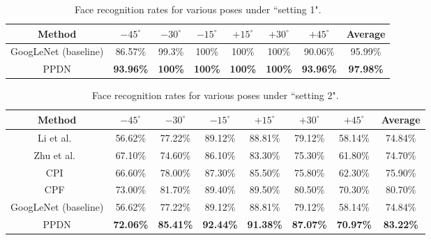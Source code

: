 \documentclass[runningheads]{llncs}
\begin{document}
\setlength{\tabcolsep}{2pt}
\begin{table}[!tp]
	\begin{center}
		\caption{Face recognition rates for various poses under ``setting 1". }
		\label{table:face recognition}
		\begin{tabular}{c|c|c|c|c|c|c|c}
			\hline\noalign{\smallskip}
			Method  & $-45^{\circ}$& $-30^{\circ}$& $-15^{\circ}$& $+15^{\circ}$& $+30^{\circ}$& $+45^{\circ}$&Average\\

			\hline

			GoogLeNet (baseline)& 86.57\% & 99.3\% & 100\% & 100\%& 100\% &90.06\% & 95.99\%\\
			PPDN & \textbf{93.96\%}& \textbf{100\%} & \textbf{100\%} & \textbf{100\%} & \textbf{100\%} & \textbf{93.96\%} & \textbf{97.98\%}\\
			\hline
		\end{tabular}
	\end{center}
\end{table}


\setlength{\tabcolsep}{2pt}
\begin{table}[!tp]
	\begin{center}
		\caption{Face recognition rates for various poses under ``setting 2". }
		\label{table:face recognition2}
		\begin{tabular}{c|c|c|c|c|c|c|c}
			\hline\noalign{\smallskip}
			Method  & $-45^{\circ}$& $-30^{\circ}$& $-15^{\circ}$& $+15^{\circ}$& $+30^{\circ}$& $+45^{\circ}$&Average\\

			\hline

			Li et al.~\cite{li2012coupled}& 56.62\% & 77.22\% & 89.12\% & 88.81\%& 79.12\% &58.14\% & 74.84\%\\
			Zhu et al.~\cite{zhu2013deep}& 67.10\% & 74.60\% & 86.10\% & 83.30\%& 75.30\% &61.80\% & 74.70\%\\
			CPI~\cite{yim2015rotating}& 66.60\% & 78.00\% & 87.30\% & 85.50\%& 75.80\% &62.30\% & 75.90\%\\
			CPF~\cite{yim2015rotating}& 73.00\% & 81.70\% & 89.40\% & 89.50\%& 80.50\% &70.30\% & 80.70\%\\
			GoogLeNet (baseline)& 56.62\% & 77.22\% & 89.12\% & 88.81\%& 79.12\% &58.14\% & 74.84\%\\
			\hline
			PPDN & \textbf{72.06\%} & \textbf{85.41\%} & \textbf{92.44\%} & \textbf{91.38\%}& \textbf{87.07\%} &\textbf{70.97\%} & \textbf{83.22\%}\\
			\hline
		\end{tabular}
	\end{center}
\end{table}
\end{document}
